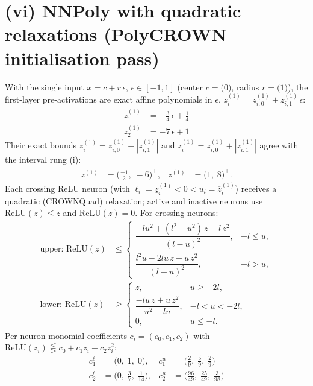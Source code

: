\documentclass[11pt]{article}
\begin{document}
\section{(vi) NNPoly with quadratic relaxations (PolyCROWN initialisation pass)}
With the single input $x = c + r\,\epsilon$, $\epsilon \in [-1, 1]$ (center $c = \bigl(0\bigr)$, radius $r = \bigl(1\bigr)$), the first-layer pre-activations are exact affine polynomials in $\epsilon$, $z^{(1)}_i = z^{(1)}_{i,0} + z^{(1)}_{i,1}\,\epsilon$:
\begin{align*}
z^{(1)}_{1} &= -\frac{3}{4}\,\epsilon + \frac{1}{4} \\
z^{(1)}_{2} &= -7\,\epsilon + 1
\end{align*}
Their exact bounds $\underline{z}^{(1)}_i = z^{(1)}_{i,0} - |z^{(1)}_{i,1}|$ and $\overline{z}^{(1)}_i = z^{(1)}_{i,0} + |z^{(1)}_{i,1}|$ agree with the interval rung (i):
\begin{align*}
\underline{z^{(1)}} &= \bigl(\frac{-1}{2},\; -6\bigr)^{\!\top}, & \overline{z^{(1)}} &= \bigl(1,\; 8\bigr)^{\!\top}.
\end{align*}
Each crossing ReLU neuron (with $\ell_i = \underline{z}^{(1)}_i < 0 < u_i = \overline{z}^{(1)}_i$)
receives a quadratic (CROWNQuad) relaxation; active and inactive neurons use $\mathrm{ReLU}(z) \le z$
and $\mathrm{ReLU}(z) = 0$. For crossing neurons:
\begin{align*}
\text{upper: } \mathrm{ReLU}(z) &\le \begin{cases} \dfrac{-l u^2 + (l^2 + u^2)\, z - l\, z^2}{(l - u)^2}, & -l \le u, \\[3mm] \dfrac{l^2 u - 2 l u\, z + u\, z^2}{(l - u)^2}, & -l > u, \end{cases} \\[2mm]
\text{lower: } \mathrm{ReLU}(z) &\ge \begin{cases} z, & u \ge -2l, \\[3mm] \dfrac{-l u\, z + u\, z^2}{u^2 - l u}, & -l < u < -2l, \\[3mm] 0, & u \le -l. \end{cases}
\end{align*}
Per-neuron monomial coefficients $c_i = (c_0, c_1, c_2)$ with $\mathrm{ReLU}(z_i) \lesseqgtr c_0 + c_1 z_i + c_2 z_i^2$:
\begin{align*}
c^{\ell}_{1} &= \bigl(0,\; 1,\; 0\bigr), & c^{u}_{1} &= \bigl(\frac{2}{9},\; \frac{5}{9},\; \frac{2}{9}\bigr) \\
c^{\ell}_{2} &= \bigl(0,\; \frac{3}{7},\; \frac{1}{14}\bigr), & c^{u}_{2} &= \bigl(\frac{96}{49},\; \frac{25}{49},\; \frac{3}{98}\bigr)
\end{align*}
\end{document}
